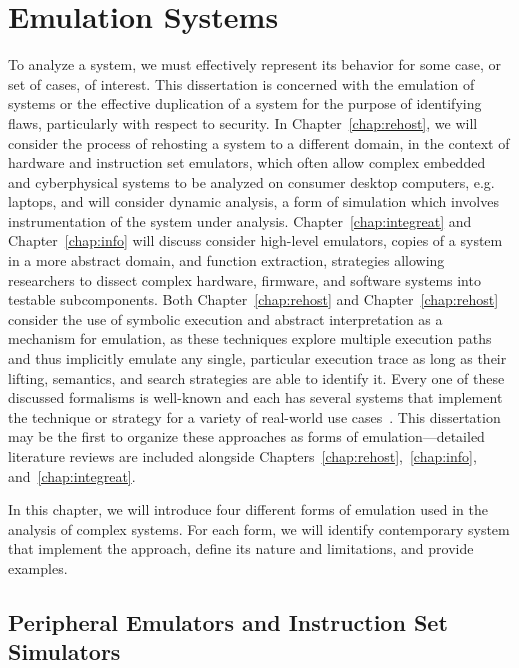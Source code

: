 \chapter{Emulation Systems}
\label{chap:emulation}

To analyze a system, we must effectively represent its behavior for some case, or set of cases, of interest.
This dissertation is concerned with the emulation of systems or the effective duplication of a system for the purpose of identifying flaws, particularly with respect to security.
In Chapter~\ref{chap:rehost}, we will consider the process of rehosting a system to a different domain, in the context of hardware and instruction set emulators, which often allow complex embedded and cyberphysical systems to be analyzed on consumer desktop computers, e.g. laptops, and will consider dynamic analysis, a form of simulation which involves instrumentation of the system under analysis.
Chapter~\ref{chap:integreat} and Chapter~\ref{chap:info} will discuss consider high-level emulators, copies of a system in a more abstract domain, and function extraction, strategies allowing researchers to dissect complex hardware, firmware, and software systems into testable subcomponents.
Both Chapter~\ref{chap:rehost} and Chapter~\ref{chap:rehost} consider the use of symbolic execution and abstract interpretation as a mechanism for emulation, as these techniques explore multiple execution paths and thus implicitly emulate any single, particular execution trace as long as their lifting, semantics, and search strategies are able to identify it.
Every one of these discussed formalisms is well-known and each has several systems that implement the technique or strategy for a variety of real-world use cases~\cite{bellard2005qemu, quynh2015unicorn, deng2013bistro, caballero2009binary, sen2013jalangi, zaddach2014avatar, wang2017angr, cadar2008klee}.
This dissertation may be the first to organize these approaches as forms of emulation---detailed literature reviews are included alongside Chapters~\ref{chap:rehost},\ \ref{chap:info}, and~\ref{chap:integreat}.

In this chapter, we will introduce four different forms of emulation used in the analysis of complex systems.
For each form, we will identify contemporary system that implement the approach, define its nature and limitations, and provide examples.

\section{Peripheral Emulators and Instruction Set Simulators}
\label{sec:hardemu}

